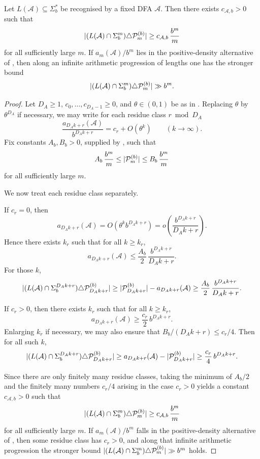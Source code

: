 \begin{corollary}
  \label{cor:dfa-prime-symmetric-diff}
  Let \(L(\mathcal A)\subseteq\Sigma_b^\ast\) be recognised by a fixed
  DFA \(\mathcal A\). Then there exists \(c_{\mathcal A,b}>0\) such that
  \[
    \lvert (L(\mathcal A)\cap\Sigma_b^m)\triangle \mathcal P_m^{(b)} \rvert
    \ge c_{\mathcal A,b}\,\frac{b^m}{m}
  \]
  for all sufficiently large \(m\). If \(a_m(\mathcal A)/b^m\) lies in
  the positive-density alternative of ,
  then along an infinite arithmetic progression of lengths one has the
  stronger bound
  \[
    \lvert (L(\mathcal A)\cap\Sigma_b^m)\triangle \mathcal P_m^{(b)} \rvert\gg b^m.
  \]
\end{corollary}

\begin{proof}
  Let \(D_A\ge 1\), \(c_0,\dots,c_{D_A-1}\ge 0\), and \(\theta\in(0,1)\) be
  as in . Replacing \(\theta\) by
  \(\theta^{D_A}\) if necessary, we may write for each residue class
  \(r\bmod D_A\)
  \[
    \frac{a_{D_Ak+r}(\mathcal A)}{b^{D_Ak+r}}=c_r+O(\theta^k)
    \qquad (k\to\infty).
  \]
  Fix constants \(A_b,B_b>0\), supplied by
  , such that
  \[
    A_b\,\frac{b^m}{m}\le \lvert \mathcal P_m^{(b)} \rvert\le B_b\,\frac{b^m}{m}
  \]
  for all sufficiently large \(m\).

  We now treat each residue class separately.

  If \(c_r=0\), then
  \[
    a_{D_Ak+r}(\mathcal A)=O(\theta^k b^{D_Ak+r})
    =o\!\left(\frac{b^{D_Ak+r}}{D_Ak+r}\right).
  \]
  Hence there exists \(k_r\) such that for all \(k\ge k_r\),
  \[
    a_{D_Ak+r}(\mathcal A)
    \le \frac{A_b}{2}\,\frac{b^{D_Ak+r}}{D_Ak+r}.
  \]
  For those \(k\),
  \[
    \lvert (L(\mathcal A)\cap\Sigma_b^{D_Ak+r})\triangle \mathcal P_{D_Ak+r}^{(b)} \rvert
    \ge \lvert \mathcal P_{D_Ak+r}^{(b)} \rvert-a_{D_Ak+r}(\mathcal A)
    \ge \frac{A_b}{2}\,\frac{b^{D_Ak+r}}{D_Ak+r}.
  \]

  If \(c_r>0\), then there exists \(k_r\) such that for all \(k\ge k_r\),
  \[
    a_{D_Ak+r}(\mathcal A)\ge \frac{c_r}{2}\,b^{D_Ak+r}.
  \]
  Enlarging \(k_r\) if necessary, we may also ensure that
  \(B_b/(D_Ak+r)\le c_r/4\). Then for all such \(k\),
  \[
    \lvert (L(\mathcal A)\cap\Sigma_b^{D_Ak+r})\triangle \mathcal P_{D_Ak+r}^{(b)} \rvert
    \ge a_{D_Ak+r}(\mathcal A)-\lvert \mathcal P_{D_Ak+r}^{(b)} \rvert
    \ge \frac{c_r}{4}\,b^{D_Ak+r}.
  \]

  Since there are only finitely many residue classes, taking the minimum
  of \(A_b/2\) and the finitely many numbers \(c_r/4\) arising in the
  case \(c_r>0\) yields a constant \(c_{\mathcal A,b}>0\) such that
  \[
    \lvert (L(\mathcal A)\cap\Sigma_b^m)\triangle \mathcal P_m^{(b)} \rvert
    \ge c_{\mathcal A,b}\,\frac{b^m}{m}
  \]
  for all sufficiently large \(m\). If \(a_m(\mathcal A)/b^m\) falls in
  the positive-density alternative of ,
  then some residue class has \(c_r>0\), and along that infinite
  arithmetic progression the stronger bound
  \(\lvert (L(\mathcal A)\cap\Sigma_b^m)\triangle \mathcal P_m^{(b)} \rvert\gg b^m\)
  holds.
\end{proof}

